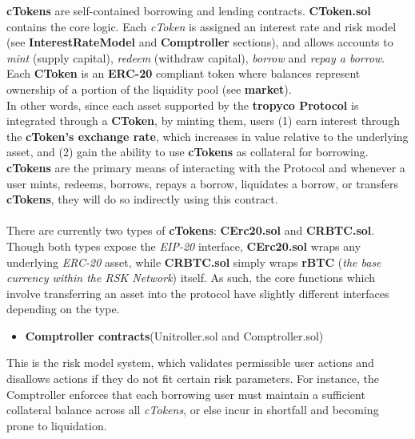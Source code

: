 \documentclass{article}
\begin{document}
\textbf{cTokens} are self-contained borrowing and lending contracts. \textbf{CToken.sol} contains the core logic. Each \textit{cToken} is assigned an interest rate and risk model (see \textbf{InterestRateModel} and \textbf{Comptroller} sections), and allows accounts to \textit{mint} (supply capital), \textit{redeem} (withdraw capital), \textit{borrow} and \textit{repay a borrow}. Each \textbf{CToken} is an \textbf{ERC-20} compliant token where balances represent ownership of a portion of the liquidity pool (see \textbf{market}).
\\
In other words, since each asset supported by the \textbf{tropyco Protocol} is integrated through a \textbf{CToken}, by minting them, users (1) earn interest through the \textbf{cToken's exchange rate}, which increases in value relative to the underlying asset, and (2) gain the ability to use \textbf{cTokens} as collateral for borrowing.\\
\textbf{cTokens} are the primary means of interacting with the Protocol and whenever a user mints, redeems, borrows, repays a borrow, liquidates a borrow, or transfers \textbf{cTokens}, they will do so indirectly using this contract. \\
\\
There are currently two types of \textbf{cTokens}: \textbf{CErc20.sol} and \textbf{CRBTC.sol}. Though both types expose the \textit{EIP-20} interface, \textbf{CErc20.sol} wraps any underlying \textit{ERC-20} asset, while \textbf{CRBTC.sol} simply wraps \textbf{rBTC} (\textit{the base currency within the RSK Network}) itself. As such, the core functions which involve transferring an asset into the protocol have slightly different interfaces depending on the type.

\begin{itemize}
\item \textbf{Comptroller contracts}(Unitroller.sol and Comptroller.sol)
\end{itemize}

This is the risk model system, which validates permissible user actions and disallows actions if they do not fit certain risk parameters. For instance, the Comptroller enforces that each borrowing user must maintain a sufficient collateral balance across all \textit{cTokens}, or else incur in shortfall and becoming prone to liquidation.
\\
\end{document}
